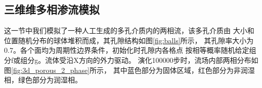 
\subsection{三维维多相渗流模拟}
这一节中我们模拟了一种人工生成的多孔介质内的两相流，该多孔介质由
大小和位置随机分布的球体堆积而成，其孔隙结构如图\ref{fig:balls}所示，
其孔隙率大小为0.7。各个面均为周期性边界条件，初始化时孔隙内各格点
按相等概率随机给定组分f或组分g。流体受沿X方向的外力驱动。
演化100000步时，流场内部两相分布如图\ref{fig:3d_porous_2_phase}所示，
其中蓝色部分为固体区域，红色部分为非润湿相，绿色部分为润湿相。

\begin{figure}[htpb]
  \centering
\end{figure}
